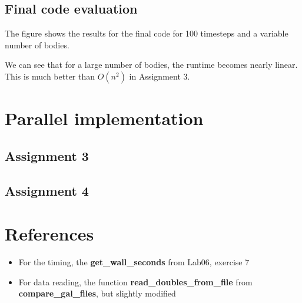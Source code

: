 \documentclass[a4paper]{scrartcl}
\begin{document}
    \subsection{Final code evaluation}
        The figure shows the results for the final code for 100 timesteps
        and a variable number of bodies.

    We can see that for a large number of bodies, the runtime becomes nearly
    linear. This is much better than $O(n^2)$ in Assignment 3. 

\section{Parallel implementation}
    \subsection{Assignment 3}
    \subsection{Assignment 4}

            

\section{References}
    \begin{itemize}
        \item For the timing, the \textbf{get\_wall\_seconds} from Lab06, exercise 7
        \item For data reading, the function \textbf{read\_doubles\_from\_file} from \textbf{compare\_gal\_files}, but slightly modified
    \end{itemize}
\end{document}
